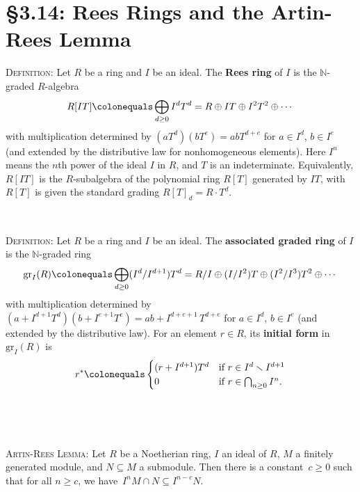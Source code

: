 \documentclass[12pt]{amsart}
\newcommand{\N}{\mathbb{N}}
\newcommand{\1}{\mathbbm{1}}
\newcommand{\showsol}[1]{\def\displaysol{#1}}
\newcommand\ceq{\colonequals}
\begin{document}
\showsol{0}
	
	\thispagestyle{empty}
	
	\section*{\S3.14: Rees Rings and the Artin-Rees Lemma}	

\begin{framed}

\noindent \textsc{Definition:} Let $R$ be a ring and $I$ be an ideal.
The \textbf{Rees ring} of $I$ is the $\N$-graded $R$-algebra
\[  R[IT] \ceq \bigoplus_{d\geq 0} I^d T^d = R \oplus I T \oplus I^2 T^2 \oplus \cdots \]
with multiplication determined by $(a T^d)(b T^e) = ab T^{d+e}$ for $a\in I^d$, $b\in I^e$ (and extended by the distributive law for nonhomogeneous elements). Here $I^n$ means the $n$th power of the ideal $I$ in $R$, and $T$ is an indeterminate. Equivalently, $R[IT]$ is the $R$-subalgebra of the polynomial ring $R[T]$ generated by $IT$, with $R[T]$ is given the standard grading $R[T]_d = R \cdot T^d$.

\

\noindent \textsc{Definition:} Let $R$ be a ring and $I$ be an ideal.
The \textbf{associated graded ring} of $I$ is the $\N$-graded ring
\[ \mathrm{gr}_I(R) \ceq \bigoplus_{d\geq 0} (I^d / I^{d+1}) T^d = R/I \oplus (I/I^2) T \oplus (I^2/I^3) T^2 \oplus \cdots \]
with multiplication determined by $(a+I^{d+1} T^d)(b + I^{e+1} T^e) = ab+I^{d+e+1} \, T^{d+e}$ for $a\in I^d$, $b\in I^e$ (and extended by the distributive law).
For an element $r\in R$, its \textbf{initial form} in $\mathrm{gr}_I(R)$ is
\[ r^* \ceq \begin{cases} (r+ I^{d+1})T^d &\text{if} \ r\in I^d \smallsetminus I^{d+1} \\ 0 &\text{if} \ r\in \bigcap_{n\geq 0} I^n.\end{cases}\]

\

\

\noindent \textsc{Artin-Rees Lemma:} Let $R$ be a Noetherian ring, $I$ an ideal of $R$, $M$ a finitely generated module, and $N\subseteq M$ a submodule. Then there is a constant\footnotemark\ $c\geq 0$ such that for all $n\geq c$, we have~${I^{n} M \cap N \subseteq I^{n-c} N}$.

 \end{framed}
 
\end{document}
